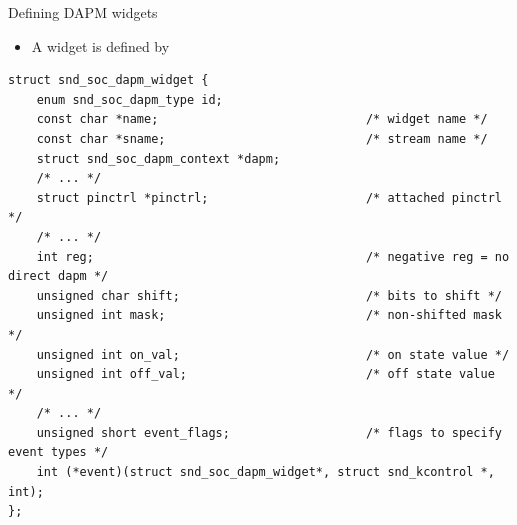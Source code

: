 \begin{frame}[fragile]{Defining DAPM widgets}
  \begin{itemize}
  \item A widget is defined by 
  \end{itemize}
  \begin{block}{}
    \fontsize{9}{9}\selectfont
    \begin{verbatim}
struct snd_soc_dapm_widget {
    enum snd_soc_dapm_type id;
    const char *name;                             /* widget name */
    const char *sname;                            /* stream name */
    struct snd_soc_dapm_context *dapm;
    /* ... */
    struct pinctrl *pinctrl;                      /* attached pinctrl */
    /* ... */
    int reg;                                      /* negative reg = no direct dapm */
    unsigned char shift;                          /* bits to shift */
    unsigned int mask;                            /* non-shifted mask */
    unsigned int on_val;                          /* on state value */
    unsigned int off_val;                         /* off state value */
    /* ... */
    unsigned short event_flags;                   /* flags to specify event types */
    int (*event)(struct snd_soc_dapm_widget*, struct snd_kcontrol *, int);
};
    \end{verbatim}
  \end{block}
\end{frame}

